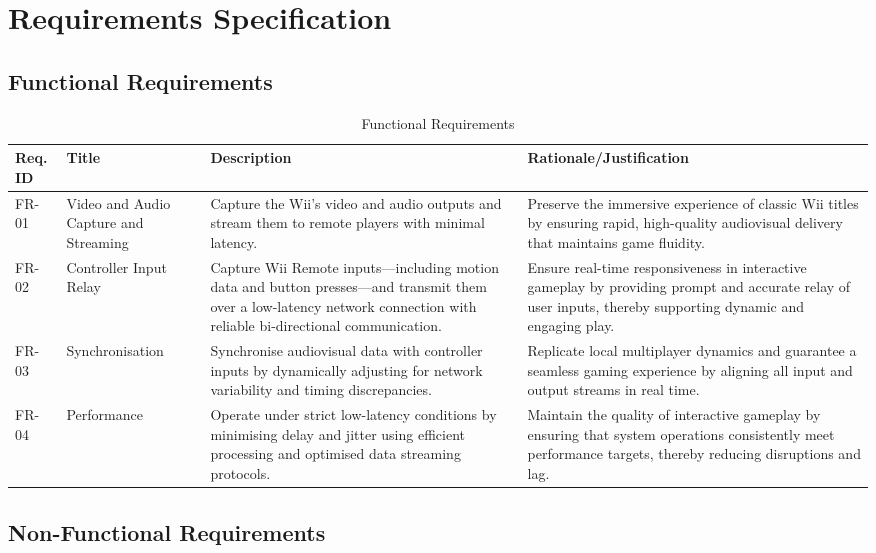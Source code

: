 \chapter{Requirements Specification}
\label{chapter:requirements}

\section{Functional Requirements}

\begin{table}[!ht]
    \centering
    \begin{tabular}{|p{1cm}|p{3cm}|p{6cm}|p{5cm}|}
      \hline
        Req. ID & Title & Description & Rationale/Justification \\ \hline
        FR-01 & Video and Audio Capture and Streaming & Capture the Wii’s video and audio outputs and stream them to remote players with minimal latency. & Preserve the immersive experience of classic Wii titles by ensuring rapid, high-quality audiovisual delivery that maintains game fluidity. \\ \hline
        FR-02 & Controller Input Relay & Capture Wii Remote inputs—including motion data and button presses—and transmit them over a low-latency network connection with reliable bi-directional communication. & Ensure real-time responsiveness in interactive gameplay by providing prompt and accurate relay of user inputs, thereby supporting dynamic and engaging play. \\ \hline
        FR-03 & Synchronisation & Synchronise audiovisual data with controller inputs by dynamically adjusting for network variability and timing discrepancies. & Replicate local multiplayer dynamics and guarantee a seamless gaming experience by aligning all input and output streams in real time. \\ \hline
        FR-04 & Performance & Operate under strict low-latency conditions by minimising delay and jitter using efficient processing and optimised data streaming protocols. & Maintain the quality of interactive gameplay by ensuring that system operations consistently meet performance targets, thereby reducing disruptions and lag. \\ \hline
    \end{tabular}
    \caption{Functional Requirements}
    \label{tab:functional-requirements}
\end{table}

\pagebreak
\section{Non-Functional Requirements}

